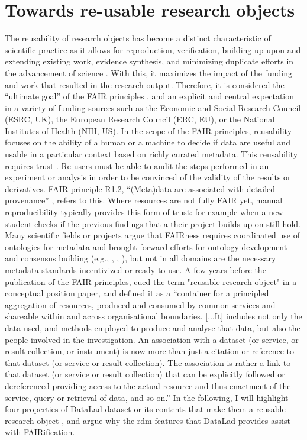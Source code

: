 \section{Towards re-usable research objects}


The reusability of research objects has become a distinct characteristic of scientific practice as it allows for reproduction, verification, building up upon and extending existing work, evidence synthesis, and minimizing duplicate efforts in the advancement of science \citep{thanos2017research}.
With this, it maximizes the impact of the funding and work that resulted in the research output.
Therefore, it is considered the “ultimate goal” of the FAIR principles \citep{wilkinson2016fair}, and an explicit and central expectation in a variety of funding sources such as the Economic and Social Research Council (ESRC, UK), the European Research Council (ERC, EU), or the National Institutes of Health (NIH, US).
In the scope of the FAIR principles, reusability focuses on the ability of a human or a machine to decide if data are useful and usable in a particular context based on richly curated metadata.
This reusability requires trust \citep{bechhofer2010research}. Re-users must be able to audit the steps performed in an experiment or analysis in order to be convinced of the validity of the results or derivatives.
FAIR principle R1.2, ``(Meta)data are associated with detailed provenance'' \citep{wilkinson2016fair}, refers to this.
Where resources are not fully FAIR yet, manual reproducibility typically provides this form of trust: for example when a new student checks if the previous findings that a their project builds up on still hold.\\

Many scientific fields or projects argue that FAIRness requires coordinated use of ontologies for metadata and brought forward efforts for ontology development and consensus building (e.g., \citep{wise2019implementation}, \citep{abrams2022standards}, \citep{papadiamantis2020metadata}), but not in all domains are the necessary metadata standards incentivized or ready to use.
A few years before the publication of the FAIR principles, \citet{bechhofer2013linked} cued the term "reusable research object" in a conceptual position paper, and defined it as a ``container for a principled aggregation of resources, produced and consumed by common services and shareable within and across organisational boundaries. [...It] includes not only the data used, and methods employed to produce and analyse that data, but also the people involved in the investigation. An association with a dataset (or service, or result collection, or instrument) is now more than just a citation or reference to that dataset (or service or result collection). The association is rather a link to that dataset (or service or result collection) that can be explicitly followed or dereferenced providing access to the actual resource and thus enactment of the service, query or retrieval of data, and so on.''
In the following, I will highlight four properties of DataLad dataset or its contents that make them a reusable research object \citep{wagnerohbm2021}, and argue why the \gls{rdm} features that DataLad provides assist with FAIRification.

